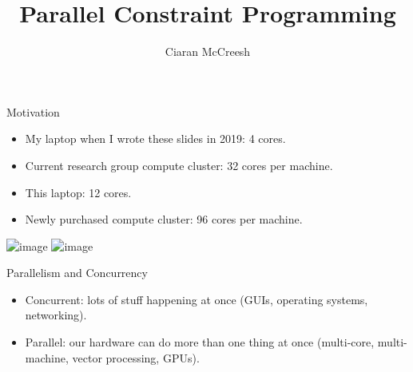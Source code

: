 \documentclass[aspectratio=169,compress,10pt]{beamer}
\author{Ciaran McCreesh}
\title{Parallel Constraint Programming}
\begin{document}
{
    \begin{frame}
        \titlepage
    \end{frame}
}

\begin{frame}[t]{Motivation}
    \begin{itemize}
        \item My laptop when I wrote these slides in 2019: 4 cores.
        \item Current research group compute cluster: 32 cores per machine.
        \item <2-> This laptop: 12 cores.
        \item <2-> Newly purchased compute cluster: 96 cores per machine.
    \end{itemize}

    \vfill
    \centering \includegraphics<1>[keepaspectratio=true,scale=0.08]{fatanode.png}
    \centering \includegraphics<2>[keepaspectratio=true,scale=0.80]{fatanode2.png}
\end{frame}

\begin{frame}{Parallelism and Concurrency}
    \begin{itemize}
        \item Concurrent: lots of stuff happening at once (GUIs, operating systems, networking).

        \item Parallel: our hardware can do more than one thing at once (multi-core, multi-machine,
            vector processing, GPUs).
    \end{itemize}
\end{frame}
\end{document}
